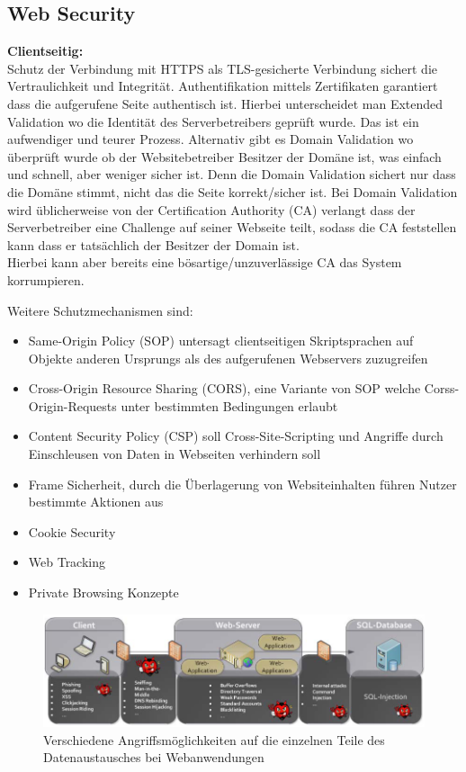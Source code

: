 \documentclass[a4paper,12pt,leqno]{article}
\begin{document}
\subsection{Web Security}


\textbf{Clientseitig:}\\
Schutz der Verbindung mit HTTPS als TLS-gesicherte Verbindung sichert die Vertraulichkeit und Integrität. Authentifikation mittels Zertifikaten garantiert dass die aufgerufene Seite authentisch ist. Hierbei unterscheidet man Extended Validation wo die Identität des Serverbetreibers  geprüft wurde. Das ist ein aufwendiger und teurer Prozess. Alternativ gibt es Domain Validation wo überprüft wurde ob der Websitebetreiber Besitzer der Domäne ist, was einfach und schnell, aber weniger sicher ist. Denn die Domain Validation sichert nur dass die Domäne stimmt, nicht das die Seite korrekt/sicher ist. Bei Domain Validation wird üblicherweise von der Certification Authority (CA) verlangt dass der Serverbetreiber eine Challenge auf seiner Webseite teilt, sodass die CA feststellen kann dass er tatsächlich der Besitzer der Domain ist.\\
Hierbei kann aber bereits eine bösartige/unzuverlässige CA das System korrumpieren.

Weitere Schutzmechanismen sind:
\begin{itemize}
\item Same-Origin Policy (SOP) untersagt clientseitigen Skriptsprachen auf Objekte anderen Ursprungs als des aufgerufenen Webservers zuzugreifen
\item Cross-Origin Resource Sharing (CORS), eine Variante von SOP welche Corss-Origin-Requests unter bestimmten Bedingungen erlaubt
\item Content Security Policy (CSP) soll Cross-Site-Scripting und Angriffe durch Einschleusen von Daten in Webseiten verhindern soll
\item Frame Sicherheit, durch die Überlagerung von Websiteinhalten führen Nutzer bestimmte Aktionen aus
\item Cookie Security
\item Web Tracking
\item Private Browsing Konzepte
\end{itemize}

\begin{figure}[h!]
\centering
\includegraphics[scale=0.65]{Grafiken/AngriffeWebanwendung.png}
\caption{Verschiedene Angriffsmöglichkeiten auf die einzelnen Teile des Datenaustausches bei Webanwendungen}
\end{figure}
\end{document}
